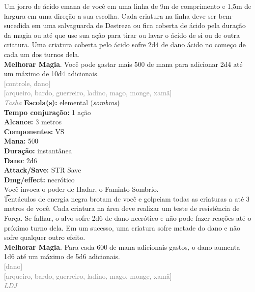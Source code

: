 \documentclass{RPG_Adventure}[2021/10/20]
\begin{document}
{\normalsize Um jorro de ácido emana de você em uma linha de 9m de comprimento e 1,5m de largura em uma direção a sua escolha. Cada criatura na linha deve ser bem-sucedida em uma salvaguarda de Destreza ou fica coberta de ácido pela duração da magia ou até que use sua ação para tirar ou lavar o ácido de si ou de outra criatura. Uma criatura coberta pelo ácido sofre 2d4 de dano ácido no começo de cada um dos turnos dela.\\\t \textbf{Melhorar Magia}. Você pode gastar mais 500 de mana para adicionar 2d4 até um máximo de 10d4 adicionais.\\}
{\scriptsize \textcolor{gray}{[controle, dano]\\}}
{\scriptsize \textcolor{gray}{[arqueiro, bardo, guerreiro, ladino, mago, monge, xamã]\\}}
{\tiny \textcolor{gray}{\textit{Tasha}}}\jump{}
{\small \t \textbf{Escola(s):} elemental (\textit{sombras})\\\t \textbf{Tempo conjuração:} 1 ação\\\t \textbf{Alcance:} 3 metros\\\t \textbf{Componentes:} VS\\\t \textbf{Mana:} 500\\\t \textbf{Duração:} instantânea\\\t \textbf{Dano}: 2d6\\\t \textbf{Attack/Save:} STR Save\\\t \textbf{Dmg/effect:} necrótico\\}
{\normalsize Você invoca o poder de Hadar, o Faminto Sombrio.\\\t Tentáculos de energia negra brotam de você e golpeiam todas as criaturas a até 3 metros de você. Cada criatura na área deve realizar um teste de resistência de Força. Se falhar, o alvo sofre 2d6 de dano necrótico e não pode fazer reações até o próximo turno dela. Em um sucesso, uma criatura sofre metade do dano e não sofre qualquer outro efeito.\\\t \textbf{Melhorar Magia.} Para cada 600 de mana adicionais gastos, o dano aumenta 1d6 até um máximo de 5d6 adicionais.\\}
{\scriptsize \textcolor{gray}{[dano]\\}}
{\scriptsize \textcolor{gray}{[arqueiro, bardo, guerreiro, ladino, mago, monge, xamã]\\}}
{\tiny \textcolor{gray}{\textit{LDJ}}}\jump{}
\end{document}
